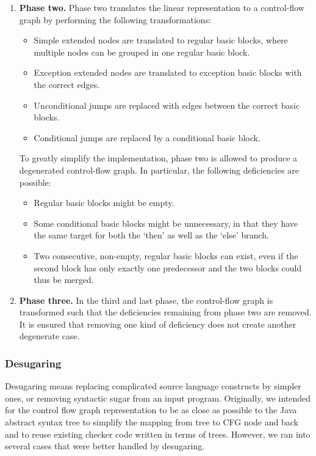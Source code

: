 \begin{enumerate}
    \item \textbf{Phase two.} Phase two translates the linear
      representation to a control-flow graph by performing the
      following transformations:
    \begin{itemize}
        \item Simple extended nodes are translated to regular basic
          blocks, where multiple nodes can be grouped in one regular
          basic block.
        \item Exception extended nodes are translated to exception
          basic blocks with the correct edges.
        \item Unconditional jumps are replaced with edges between the
          correct basic blocks.
        \item Conditional jumps are replaced by a conditional basic
          block.
    \end{itemize}
    To greatly simplify the implementation, phase two is allowed to
    produce a degenerated control-flow graph. In particular, the
    following deficiencies are possible:
    \begin{itemize}
    \item Regular basic blocks might be empty.
    \item Some conditional basic blocks might be unnecessary, in that
      they have the same target for both the `then' as well as the
      `else' branch.
    \item Two consecutive, non-empty, regular basic blocks can exist,
      even if the second block has only exactly one predecessor and
      the two blocks could thus be merged.
    \end{itemize}
    \item \textbf{Phase three.} In the third and last phase, the
      control-flow graph is transformed such that the deficiencies
      remaining from phase two are removed. It is ensured that
      removing one kind of deficiency does not create another
      degenerate case.
\end{enumerate}



\subsubsection{Desugaring}
\label{sec:desugaring}

Desugaring means replacing complicated source language constructs by
simpler ones, or removing syntactic sugar from an input program.
Originally, we intended for the control flow graph representation to
be as close as possible to the Java abstract syntax tree to simplify
the mapping from tree to CFG node and back and to reuse existing
checker code written in terms of trees.  However, we ran into several
cases that were better handled by desugaring.

